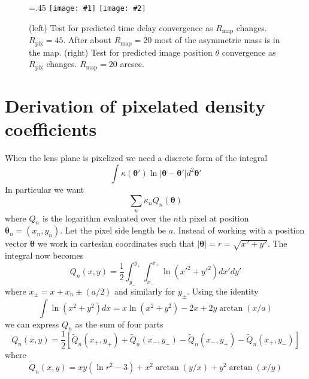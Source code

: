 \documentclass[galley]{mn2e}
\newcommand{\Rmap}{\ensuremath{R_\mathrm{map}}}
\newcommand{\Rpix}{\ensuremath{R_\mathrm{pix}}}
\renewcommand{\vec}[1]{\ensuremath{\boldsymbol{#1}}}
\newcommand\plottwo[2]{{%
 \centering
 \leavevmode
 \columnwidth=.45\columnwidth
 \texttt{[image: \#1]}%
 \hfil
 \texttt{[image: \#2]}%
}}%
\begin{document}
\begin{figure}
\plottwo{tdconv_pr45.pdf}{imgpos_conv_mr20.pdf}
\caption{(left) Test for predicted time delay convergence as $\Rmap$ changes.
$\Rpix=45$. After about $\Rmap=20$ most of the asymmetric mass is in the map.
(right) Test for predicted image position $\theta$ convergence as $\Rpix$
changes. $\Rmap=20$ arcsec.}
\label{raytracing convergence tests}
\end{figure}

\section{Derivation of pixelated density coefficients}
\label{Q derivation}
When the lens plane is pixelized we need a discrete form of the integral
%
\[\int \kappa(\vec\theta') \ln |\vec\theta-\vec\theta'| d^2\vec\theta' \]
%
In particular we want
%
\[\sum_n \kappa_n Q_n(\vec\theta)\]
%
where $Q_n$ is the logarithm evaluated over the $n$th pixel at position $\vec\theta_n = (x_n, y_n)$. Let the pixel side length be $a$.
Instead of working with a position vector $\vec\theta$ we work in cartesian coordinates such that
%
$|\vec\theta| = r = \sqrt{x^2 + y^2}$. The integral now becomes
%
\[Q_n(x,y) = \frac12 \int_{y_-}^{y_+}\int_{x_-}^{x_+} \ln (x'^2+y'^2) dx' dy'\]
%
where $x_\pm = x + x_n \pm (a/2)$ and similarly for $y_\pm$.
Using the identity
%
\[\int \ln(x^2+y^2) dx = x \ln(x^2+y^2) - 2x + 2y\arctan(x/a) \]
%
we can express $Q_n$ as the sum of four parts
%
\[Q_n(x,y) = \frac12 \left[ \tilde Q_n(x_+,y_+)
        + \tilde Q_n(x_-,y_-)
        - \tilde Q_n(x_-,y_+)
        - \tilde Q_n(x_+,y_-) \right]\]
%
where
%
\[\tilde Q_n(x,y) = xy(\ln r^2 - 3) + x^2\arctan(y/x) + y^2\arctan(x/y)\]



\end{document}
